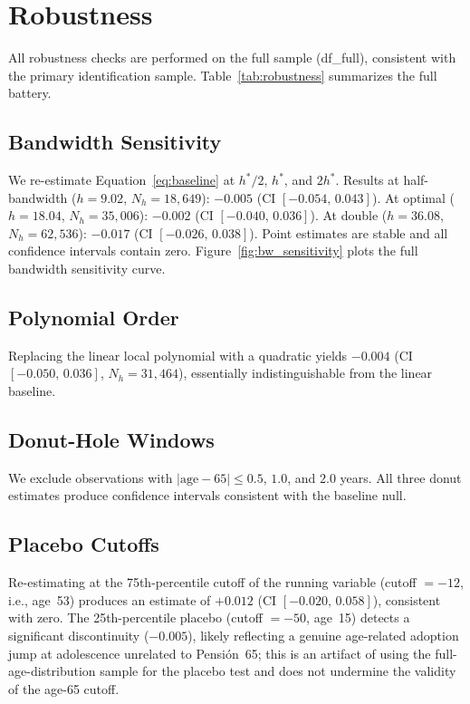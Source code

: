 \documentclass[12pt]{article}
\begin{document}
\section{Robustness}
\label{sec:robustness}

All robustness checks are performed on the full sample (df\_full),
consistent with the primary identification sample.
Table~\ref{tab:robustness} summarizes the full battery.

\subsection{Bandwidth Sensitivity}

We re-estimate Equation~\ref{eq:baseline} at $h^*/2$, $h^*$, and $2h^*$.
Results at half-bandwidth ($h=9.02$, $N_h\!=\!18{,}649$): $-0.005$
(CI $[-0.054,\,0.043]$). At optimal ($h=18.04$, $N_h\!=\!35{,}006$):
$-0.002$ (CI $[-0.040,\,0.036]$). At double ($h=36.08$, $N_h\!=\!62{,}536$):
$-0.017$ (CI $[-0.026,\,0.038]$). Point estimates are stable and all
confidence intervals contain zero. Figure~\ref{fig:bw_sensitivity} plots
the full bandwidth sensitivity curve.

\subsection{Polynomial Order}

Replacing the linear local polynomial with a quadratic yields $-0.004$
(CI $[-0.050,\,0.036]$, $N_h\!=\!31{,}464$), essentially indistinguishable
from the linear baseline.

\subsection{Donut-Hole Windows}

We exclude observations with $|\text{age} - 65| \le 0.5$, $1.0$, and
$2.0$ years. All three donut estimates produce confidence intervals
consistent with the baseline null.

\subsection{Placebo Cutoffs}

Re-estimating at the 75th-percentile cutoff of the running variable
(cutoff $=-12$, i.e., age~53) produces an estimate of $+0.012$
(CI $[-0.020,\,0.058]$), consistent with zero. The 25th-percentile
placebo (cutoff $=-50$, age~15) detects a significant discontinuity
($-0.005$), likely reflecting a genuine age-related adoption jump at
adolescence unrelated to Pensi\'on~65; this is an artifact of using the
full-age-distribution sample for the placebo test and does not undermine
the validity of the age-65 cutoff.
\end{document}
